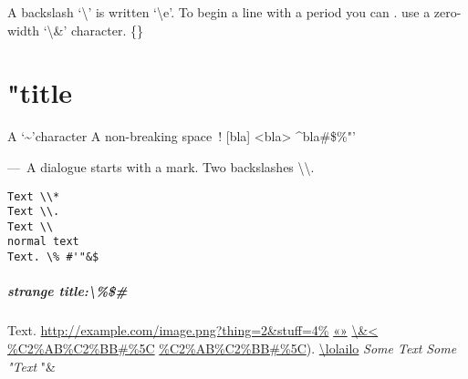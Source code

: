 A backslash `\textbackslash{}' is written `\textbackslash{}e'. To begin a line with a period you can
. use a zero-width `\textbackslash{}\&' character. \{\}

\chapter{"title}
\label{s:1}
A `\~{}'character
A non-breaking space~!
[bla]
<bla>
\^{}bla\#\$\%"'

—~A dialogue starts with a mark.
Two backslashes \textbackslash{}\textbackslash{}.

\begin{verbatim}
Text \\*
Text \\.
Text \\
normal text
Text. \% #'"&$
\end{verbatim}

\paragraph{strange title:\textbackslash{}\%\$\#}
Text.
\url{http://example.com/image.png?thing=2&stuff=4\%}
\href{example.com/image-\%C2\%AB\%C2\%BB.png}{«»}
\href{https://example.com/image.png?thing=3}{\textbackslash{}\&<}
\url{\%C2\%AB\%C2\%BB#\%5C}
\url{\%C2\%AB\%C2\%BB#\%5C}).
\hyperref[s:1]{\textbackslash{}lolailo}
\emph{Some     Text}
\emph{Some     "Text}
"\&


